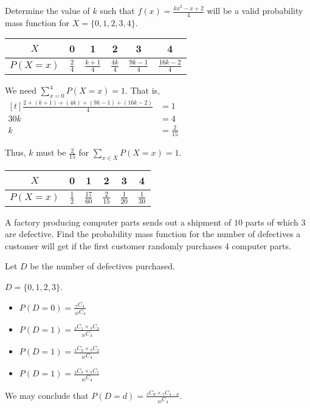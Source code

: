 \begin{example}
    Determine the value of $k$ such that $f(x) = \frac{kx^2 - x + 2}{4}$ will be a valid probability mass function for $X = \{ 0, 1, 2, 3, 4 \}$.

    \begin{center}
        \begin{tabular}{c | c c c c c}
            $X$        & 0             & 1               & 2              & 3                & 4                 \\
            \hline
            $P(X = x)$ & $\frac{2}{4}$ & $\frac{k+1}{4}$ & $\frac{4k}{4}$ & $\frac{9k-1}{4}$ & $\frac{16k-2}{4}$
        \end{tabular}
    \end{center}

    We need $\sum_{x=0}^4 P(X = x) = 1$. That is, 
    $\begin{aligned}[t]
        \frac{2 + (k+1) + (4k) + (9k-1) + (16k-2)}{4} & = 1            \\
        30k                                           & = 4            \\
        k                                             & = \frac{2}{15}
    \end{aligned}$

    Thus, $k$ must be $\frac{2}{15}$ for $\sum_{x \in X} P(X = x) = 1$. 

    \begin{center}
        \begin{tabular}{c | c c c c c}
            $X$        & 0             & 1               & 2              & 3              & 4              \\
            \hline
            $P(X = x)$ & $\frac{1}{2}$ & $\frac{17}{60}$ & $\frac{2}{15}$ & $\frac{1}{20}$ & $\frac{1}{30}$
        \end{tabular}
    \end{center}
\end{example}

\begin{example}
    A factory producing computer parts sends out a shipment of $10$ parts of which $3$ are defective. Find the probability mass function for the number of defectives a customer will get if the first customer randomly purchases $4$ computer parts.

    Let $D$ be the number of defectives purchased. 

    $D = \{ 0, 1, 2, 3 \}$. 

    \begin{itemize}
        \item $P(D = 0) = \frac{{}_7C_4}{{}_{10}C_4}$
        \item $P(D = 1) = \frac{{}_3C_1 \times {}_7C_3}{{}_{10}C_4}$
        \item $P(D = 1) = \frac{{}_3C_2 \times {}_7C_2}{{}_{10}C_4}$
        \item $P(D = 1) = \frac{{}_3C_3 \times {}_7C_1}{{}_{10}C_4}$
    \end{itemize}

    We may conclude that $P(D = d) = \frac{{}_3C_d \times {}_7C_{4-d}}{{}_{10}C_4}$. 
\end{example}

